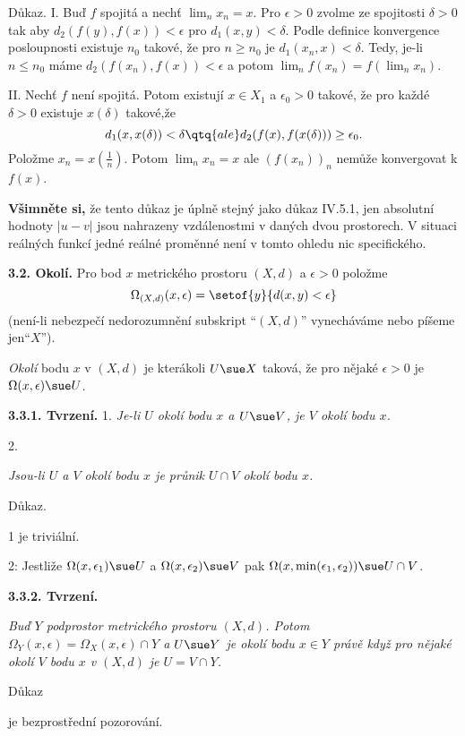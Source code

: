 \documentclass[12pt]{article}
\begin{document}
{{ Důkaz.} I.  Buď $f$ spojitá a nechť $\lim_nx_n=x$. Pro $\epsilon>0$ zvolme ze spojitosti $\delta>0$ tak aby $d_2(f(y),f(x))<\epsilon$ pro $d_1(x,y)<\delta$. Podle definice konvergence posloupnosti existuje $n_0$ takové, že pro $n\geq n_0$ je $d_1(x_n,x)<\delta.$ Tedy, je-li $n\leq n_0$ máme $d_2(f(x_n),f(x))<\epsilon$ a potom
  $\lim_nf(x_n)=f(\lim_nx_n)$.
  
  \smallskip
  
  II. Nechť $f$ není spojitá. Potom existují $x\in X_1$ a $\epsilon_0>0$
  takové, že pro každé $\delta>0$ existuje $x(\delta)$ takové,že 
  $$
  d_1(x,x(\delta))<\delta \qtq{ale} d_2(f(x),f(x(\delta)))\geq \epsilon_0.
  $$
 Položme $x_n=x(\frac1n)$. Potom $\lim_nx_n=x$ ale $(f(x_n))_n$ nemůže konvergovat k $f(x)$. \sq
  
  \medskip
  
  {\bf Všimněte si,} že tento důkaz je úplně stejný jako důkaz  IV.5.1, jen absolutní hodnoty $|u-v|$ jsou nahrazeny
 vzdálenostmi v daných dvou prostorech. V situaci reálných funkcí jedné reálné proměnné není v tomto ohledu nic specifického.
  
  \bigskip
  
  {\bf 3.2. Okolí.} Pro bod $x$ metrického prostoru $(X,d)$ a $\epsilon>0$ položme
  $$
  \Omega_{(X,d)}(x,\epsilon)=\setof{y}{d(x,y)<\epsilon}
  $$
  (není-li nebezpečí nedorozumnění subskript ``$(X,d)$'' vynecháváme nebo píšeme jen``$X$'').
  
  {\em Okolí} bodu $x$ v $(X,d)$ je kterákoli $U\sue X$ taková, že pro nějaké
   $\epsilon>0$ je $\Omega(x,\epsilon)\sue U$.
   
  \medskip
  
  {\bf 3.3.1. Tvrzení.} 1. {\em Je-li $U$ okolí bodu $x$ a $U\sue V$, je $V$  okolí bodu $x$.}
  
  2. {\em Jsou-li $U$ a $V$ okolí bodu $x$  je průnik $U\cap V$ okolí bodu $x$.
  
  Důkaz.} 1 je triviální. 
  
  2: Jestliže $\Omega(x,\epsilon_1)\sue U$ a $\Omega(x,\epsilon_2)\sue V$
  pak  $\Omega(x,\min(\epsilon_1,\epsilon_2))\sue U\cap V$. \sq
  
  \medskip
  
  {\bf 3.3.2. Tvrzení.} {\em Buď $Y$ podprostor metrického prostoru $(X,d)$. Potom $\Omega_Y(x,\epsilon)=\Omega_X(x,\epsilon)\cap Y$ a $U\sue Y$ je okolí bodu $x\in Y$ právě když pro nějaké okolí $V$ bodu $x$ v $(X,d)$ je $U=V\cap Y$. 
  
  Důkaz} je bezprostřední pozorování.\sq
  
}
\end{document}
